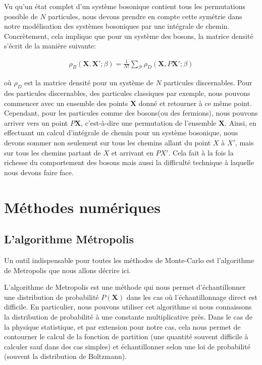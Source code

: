\documentclass[11pt]{article}
\theoremstyle{definition}
\theoremstyle{remark}
\begin{document}
Vu qu'un état complet d'un système bosonique contient tous les permutations possible de $N$ particules, nous devons prendre en compte cette symétrie dans notre modélisation des systèmes bosoniques par une intégrale de chemin. Concrètement, cela implique que pour un système des bosons, la matrice densité s'écrit de la manière suivante: 

\begin{align} 
\label{densite_boson}
\rho_{B}( \mathbf{X}, \mathbf{X}'; \beta) = \frac{1}{N!}\sum_{\mathcal{P}} \rho_{D} (\mathbf{X}, P \mathbf{X}'; \beta)
\end{align}

où $\rho_{D}$ est la matrice densité pour un système de $N$ particules discernables. Pour des particules discernables, des particules classiques par exemple, nous pouvons commencer avec un ensemble des points $\mathbf{X}$ donné et retourner à ce même point. Cependant, pour les particules comme des bosons(ou des fermions), nous pouvons arriver vers un point $P\mathbf{X}$, c'est-à-dire une permutation de l'ensemble $\mathbf{X}$. Ainsi, en effectuant un calcul d’intégrale de chemin pour un système bosonique, nous devons sommer non seulement sur tous les chemins allant du point $X$ à $X'$, mais sur tous les chemins partant de $X$ et arrivant en $PX'$. Cela fait à la fois la richesse du comportement des bosons mais aussi la difficulté technique à laquelle nous devons faire face. 

\section{Méthodes numériques}\label{sec:num}
\subsection{L'algorithme Métropolis}\label{ssec:metropolis}

Un outil indispensable pour toutes les méthodes de Monte-Carlo est l'algorithme de Metropolis que nous allons décrire ici. 

L'algorithme de Metropolis est une méthode qui nous permet d'échantillonner une distribution de probabilité $P(\mathbf{X})$ dans les cas où l’échantillonnage direct est difficile. En particulier, nous pouvons utiliser cet algorithme si nous connaissons la distribution de probabilité à une constante multiplicative près. Dans le cas de la physique statistique, et par extension pour notre cas, cela nous permet de contourner le calcul de la fonction de partition (une quantité souvent difficile à calculer sauf dans des cas simples) et échantillonner selon une loi de probabilité (souvent la distribution de Boltzmann).
\end{document}
